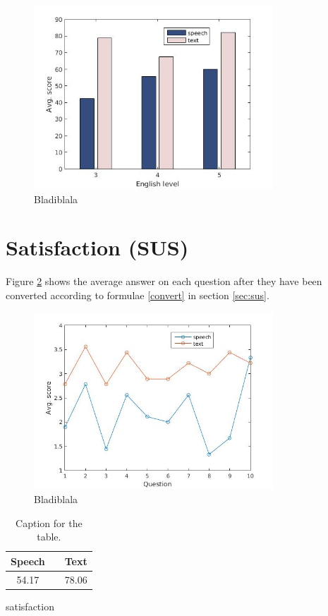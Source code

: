 \begin{figure}[p]
  \centering
  \includegraphics[width=0.8\textwidth]{images/english_score.jpg}
  \caption{Bladiblala}\label{eng_score}
\end{figure}


\section{Satisfaction (SUS)}
Figure \ref{sus_table} shows the average answer on each question after they have been converted according to formulae \ref{convert} in section \ref{sec:sus}. 
\begin{figure}[p]
  \centering
  \includegraphics[width=0.8\textwidth]{images/sus.jpg}
  \caption{Bladiblala}\label{sus_table}
\end{figure}

\begin{table}[h!]
  \centering
  \begin{tabular}{ccc}
    \toprule
    Speech &   & Text\\
    \midrule
    54.17 &   & 78.06\\
    \bottomrule
  \end{tabular}
  \caption{Caption for the table.}\label{tot_score}
\end{table}

satisfaction